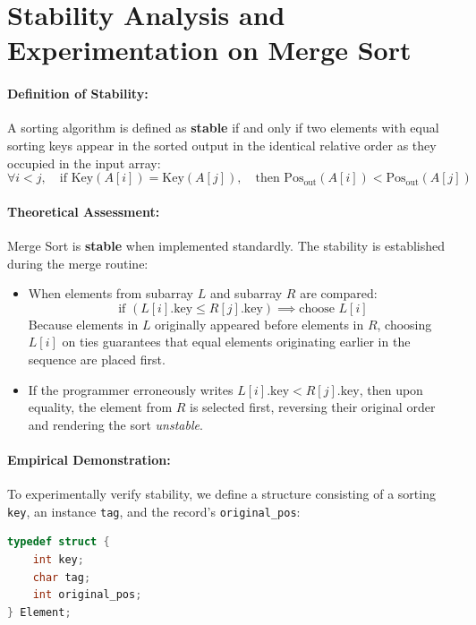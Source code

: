 \documentclass[12pt,a4paper]{article}
\theoremstyle{plain}
\theoremstyle{definition}
\theoremstyle{remark}
\begin{document}
\section{Stability Analysis and Experimentation on Merge Sort}

\paragraph{Definition of Stability:}
A sorting algorithm is defined as \textbf{stable} if and only if two elements with equal sorting keys appear in the sorted output in the identical relative order as they occupied in the input array:
\begin{equation}
\forall i < j, \quad \text{if } \text{Key}(A[i]) = \text{Key}(A[j]), \quad \text{then } \text{Pos}_{\text{out}}(A[i]) < \text{Pos}_{\text{out}}(A[j])
\end{equation}

\paragraph{Theoretical Assessment:}
Merge Sort is \textbf{stable} when implemented standardly. The stability is established during the merge routine:
\begin{itemize}
    \item When elements from subarray $L$ and subarray $R$ are compared:
    \begin{equation}
    \text{if } (L[i].\text{key} \le R[j].\text{key}) \implies \text{choose } L[i]
    \end{equation}
    Because elements in $L$ originally appeared before elements in $R$, choosing $L[i]$ on ties guarantees that equal elements originating earlier in the sequence are placed first.
    \item If the programmer erroneously writes $L[i].\text{key} < R[j].\text{key}$, then upon equality, the element from $R$ is selected first, reversing their original order and rendering the sort \textit{unstable}.
\end{itemize}

\paragraph{Empirical Demonstration:}
To experimentally verify stability, we define a structure consisting of a sorting \texttt{key}, an instance \texttt{tag}, and the record's \texttt{original\_pos}:
\begin{lstlisting}[language=C]
typedef struct {
    int key;
    char tag;
    int original_pos;
} Element;
\end{lstlisting}
\end{document}
